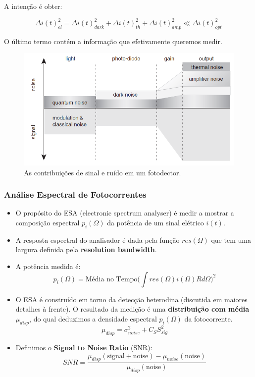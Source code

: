 A intenção é obter:

\begin{equation}
    \Delta i(t)^2_{el}=\Delta i(t)^2_{dark}+\Delta i(t)^2_{th}+\Delta i(t)^2_{amp} \ll \Delta i(t)^2_{opt}
\end{equation}

O último termo contém a informação que efetivamente queremos medir.

\begin{figure}[H]
    \centering
    \includegraphics[width=0.7\linewidth]{noise-signal plot.png}
    \caption{As contribuições de sinal e ruído em um fotodector.}
    \label{noise.signal.plot}
\end{figure}

\subsubsection{Análise Espectral de Fotocorrentes}

\begin{itemize}
    \item O propósito do ESA (electronic spectrum analyser) é medir a mostrar a composição espectral $p_i(\Omega)$ da potência de um sinal elétrico $i(t)$.
    \item A resposta espectral do analisador é dada pela função $res(\Omega)$ que tem uma largura definida pela  \textbf{resolution bandwidth}.
    \item A potência medida é:
    \begin{equation*}
        p_i(\Omega)=\text{Média no Tempo} \Big(\int{res(\Omega)i(\Omega)R d\Omega}\Big)^2
    \end{equation*}
    \item O ESA é construído em torno da detecção heterodina (discutida em maiores detalhes à frente). O resultado da medição é uma \textbf{distribuição com média $\mu_{disp}$}, do qual deduzimos a densidade espectral $p_i(\Omega)$ da fotocorrente.
    \begin{equation}
        \mu_{disp}=\sigma^2_{noise}+C_SS^2_{sig}
    \end{equation}
    \item Definimos o \textbf{Signal to Noise Ratio} (SNR):
    \begin{equation}
        SNR=\frac{\mu_{disp}(\text{signal}+\text{noise})-\mu_{noise}(\text{noise})}{\mu_{disp}(\text{noise})}
    \end{equation}
\end{itemize}

